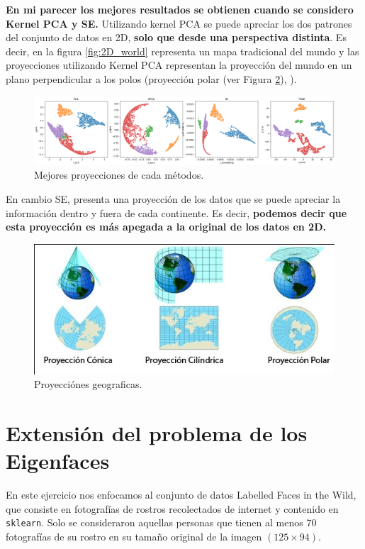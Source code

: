 \documentclass[paper=letter, fontsize=11pt]{scrartcl}
\numberwithin{equation}{section} %
\numberwithin{figure}{section} %
\numberwithin{table}{section} %
\begin{document}
\textbf{En mi parecer los mejores resultados se obtienen cuando se considero Kernel PCA y SE.} Utilizando kernel PCA se puede apreciar los dos patrones del conjunto de datos en 2D, \textbf{solo que desde una perspectiva distinta}. Es decir, en la figura \ref{fig:2D_world} representa un mapa tradicional del mundo y las proyecciones utilizando Kernel PCA representan la proyección del mundo en un plano perpendicular a los polos (proyección polar (ver Figura \ref{fig:proyecciones}), \cite{arggis}).
\begin{figure}[H]
    \centering
    \includegraphics[scale=0.37]{figure/resultados_world.png}
    \caption{Mejores proyecciones de cada métodos.}
    \label{fig:resultados_world}
\end{figure}
En cambio SE, presenta una proyección de los datos que se puede apreciar la información dentro y fuera de cada continente. Es decir, \textbf{podemos decir que esta proyección es más apegada a la original de los datos en 2D.} 
\begin{figure}[H]
    \centering
    \includegraphics[scale=0.5]{figure/proyecciones.jpg}
    \caption{Proyecciónes geograficas.}
    \label{fig:proyecciones}
\end{figure}

\section{Extensión del problema de los Eigenfaces}
En este ejercicio nos enfocamos al conjunto de datos Labelled Faces in the Wild, que consiste en fotografías de rostros recolectados de internet y contenido en \texttt{sklearn}. Solo se consideraron aquellas personas que tienen al menos 70 fotografías de su rostro en su tamaño original de la imagen $(125\times 94)$.\\
\end{document}
